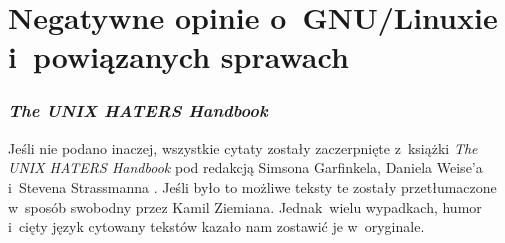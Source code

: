 \documentclass[10pt,t]{beamer}
\begin{document}



































\section{Negatywne opinie o~GNU/Linuxie i~powiązanych
  sprawach}



\begin{frame}
  \frametitle{\textit{The UNIX HATERS Handbook}}


  Jeśli nie podano inaczej, wszystkie cytaty zostały zaczerpnięte z~książki
  \textit{The UNIX HATERS Handbook} pod redakcją Simsona Garfinkela, Daniela
  Weise’a i~Stevena Strassmanna
  \parencite{Garfinkel-Weise-Strassmann-The-UNIX-HATERS-Handbook-Pub-1994}.
  Jeśli było to możliwe teksty te zostały przetłumaczone w~sposób swobodny
  przez Kamil Ziemiana. Jednak~wielu wypadkach, humor i~cięty język cytowany
  tekstów kazało nam zostawić je w~oryginale.

\end{frame}
\end{document}
